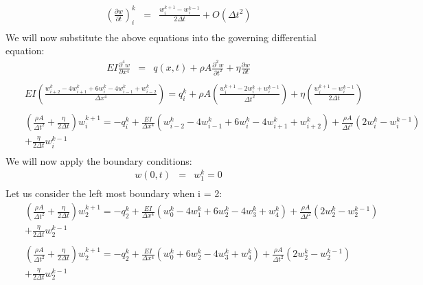 \documentclass[a4paper]{article}
\begin{document}
\begin{eqnarray*}
(\frac{\partial w }{\partial t})^{k}_{i}& = & \frac{w^{k+1}_{i} - w^{k-1}_{i} }{2 \Delta t} + O(\Delta t^{2})\\
\end{eqnarray*}
We will now substitute the above equations into the governing differential equation:
\begin{eqnarray*}
EI\frac{\partial ^{4} w}{\partial x^{4}} & = & q(x,t)+\rho A \frac{\partial ^{2} w}{\partial t^{2}} + \eta \frac{\partial w}{\partial t} \\
\end{eqnarray*}
\begin{eqnarray*}
& & EI(\frac{w^{k}_{i+2} - 4 w^{k}_{i+1} + 6 w^{k}_{i} - 4 w^{k}_{i-1} +  w^{k}_{i-2}}{\Delta x^{4}}) = q^{k}_{i}+\rho A (\frac{w^{k+1}_{i} - 2 w^{k}_{i} + w^{k-1}_{i} }{\Delta t^{2}}) + \eta (\frac{w^{k+1}_{i} - w^{k-1}_{i} }{2 \Delta t}) \\
\end{eqnarray*}
\begin{eqnarray*}
& & (\frac{\rho A}{\Delta t^{2}}+\frac{\eta}{2\Delta t})w^{k+1}_{i} = -q^{k}_{i} + \frac{EI}{\Delta x^{4}}(w^{k}_{i-2}-4w^{k}_{i-1}+6w^{k}_{i}-4w^{k}_{i+1}+w^{k}_{i+2}) + \frac{\rho A}{\Delta t^{2}}(2w^{k}_{i}-w^{k-1}_{i})\\
& & + \frac{\eta}{2\Delta t}w^{k-1}_{i}\\
\end{eqnarray*}
We will now apply the boundary conditions:
\begin{eqnarray*}
w(0,t) & = & w^{k}_{1}= 0\\
\end{eqnarray*}
Let us consider the left most boundary when i = 2:
\begin{eqnarray*}
& & (\frac{\rho A}{\Delta t^{2}}+\frac{\eta}{2\Delta t})w^{k+1}_{2} = -q^{k}_{2} + \frac{EI}{\Delta x^{4}}(w^{k}_{0}-4w^{k}_{1}+6w^{k}_{2}-4w^{k}_{3}+w^{k}_{4}) + \frac{\rho A}{\Delta t^{2}}(2w^{k}_{2}-w^{k-1}_{2})\\
& & + \frac{\eta}{2\Delta t}w^{k-1}_{2}\\
\end{eqnarray*}
\begin{eqnarray*}
& & (\frac{\rho A}{\Delta t^{2}}+\frac{\eta}{2\Delta t})w^{k+1}_{2} = -q^{k}_{2} + \frac{EI}{\Delta x^{4}}(w^{k}_{0}+6w^{k}_{2}-4w^{k}_{3}+w^{k}_{4}) + \frac{\rho A}{\Delta t^{2}}(2w^{k}_{2}-w^{k-1}_{2})\\
& & + \frac{\eta}{2\Delta t}w^{k-1}_{2}\\
\end{eqnarray*}
\end{document}
